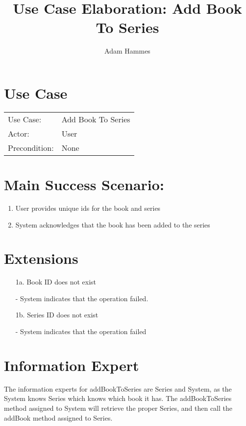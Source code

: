 \documentclass{article}
\title{Use Case Elaboration: Add Book To Series}
\author{Adam Hammes}
\begin{document}
\maketitle

\section*{Use Case}
\begin{tabular}{l l}
  Use Case:     & Add Book To Series    \\
  Actor:        & User        \\
  Precondition: & None \\
\end{tabular}

\section*{Main Success Scenario:}
\begin{enumerate}
  \item User provides unique ids for the book and series
  \item System acknowledges that the book has been added to the series
\end{enumerate}

\section*{Extensions}
\begin{itemize}
  \item [1a.] Book ID does not exist

    - System indicates that the operation failed.
    
  \item [1b.] Series ID does not exist
  
    - System indicates that the operation failed
\end{itemize}

\section*{Information Expert}

The information experts for addBookToSeries are Series and System, as the System knows
Series which knows which book it has.
The addBookToSeries method assigned to System will retrieve the proper Series, and then
call the addBook method assigned to Series.
\end{document}
